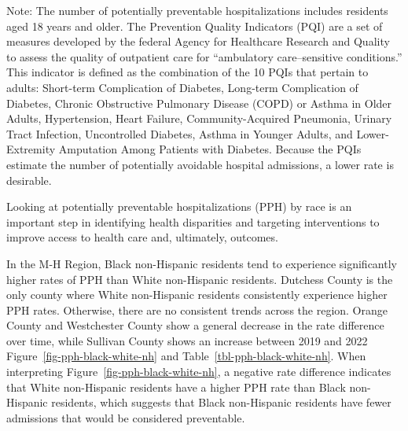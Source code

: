 \documentclass[
  english,
  letterpaper,
]{report}
\begin{document}
\begin{tcolorbox}[enhanced jigsaw, breakable, leftrule=.75mm, title=\textcolor{quarto-callout-note-color}{\faInfo}\hspace{0.5em}{Note}, bottomrule=.15mm, opacityback=0, left=2mm, colback=white, bottomtitle=1mm, coltitle=black, colbacktitle=quarto-callout-note-color!10!white, colframe=quarto-callout-note-color-frame, opacitybacktitle=0.6, toptitle=1mm, titlerule=0mm, arc=.35mm, rightrule=.15mm, toprule=.15mm]

Note: The number of potentially preventable hospitalizations includes
residents aged 18 years and older. The Prevention Quality Indicators
(PQI) are a set of measures developed by the federal Agency for
Healthcare Research and Quality to assess the quality of outpatient care
for ``ambulatory care--sensitive conditions.'' This indicator is defined
as the combination of the 10 PQIs that pertain to adults: Short-term
Complication of Diabetes, Long-term Complication of Diabetes, Chronic
Obstructive Pulmonary Disease (COPD) or Asthma in Older Adults,
Hypertension, Heart Failure, Community-Acquired Pneumonia, Urinary Tract
Infection, Uncontrolled Diabetes, Asthma in Younger Adults, and
Lower-Extremity Amputation Among Patients with Diabetes. Because the
PQIs estimate the number of potentially avoidable hospital admissions, a
lower rate is desirable.

\end{tcolorbox}

Looking at potentially preventable hospitalizations (PPH) by race is an
important step in identifying health disparities and targeting
interventions to improve access to health care and, ultimately,
outcomes.

In the M-H Region, Black non-Hispanic residents tend to experience
significantly higher rates of PPH than White non-Hispanic residents.
Dutchess County is the only county where White non-Hispanic residents
consistently experience higher PPH rates. Otherwise, there are no
consistent trends across the region. Orange County and Westchester
County show a general decrease in the rate difference over time, while
Sullivan County shows an increase between 2019 and 2022
Figure~\ref{fig-pph-black-white-nh} and
Table~\ref{tbl-pph-black-white-nh}. When interpreting
Figure~\ref{fig-pph-black-white-nh}, a negative rate difference
indicates that White non-Hispanic residents have a higher PPH rate than
Black non-Hispanic residents, which suggests that Black non-Hispanic
residents have fewer admissions that would be considered preventable.
\end{document}
